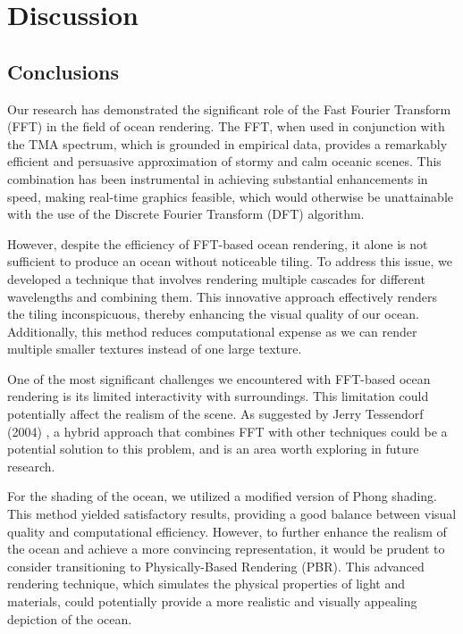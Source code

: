 \justifying
\chapter{Discussion}
\label{chapter4}

\section{Conclusions}

Our research has demonstrated the significant role of the Fast Fourier Transform (FFT) in the field of ocean rendering. The FFT, when used in conjunction with the TMA spectrum, which is grounded in empirical data, provides a remarkably efficient and persuasive approximation of stormy and calm oceanic scenes. This combination has been instrumental in achieving substantial enhancements in speed, making real-time graphics feasible, which would otherwise be unattainable with the use of the Discrete Fourier Transform (DFT) algorithm.

However, despite the efficiency of FFT-based ocean rendering, it alone is not sufficient to produce an ocean without noticeable tiling. To address this issue, we developed a technique that involves rendering multiple cascades for different wavelengths and combining them. This innovative approach effectively renders the tiling inconspicuous, thereby enhancing the visual quality of our ocean. Additionally, this method reduces computational expense as we can render multiple smaller textures instead of one large texture.

One of the most significant challenges we encountered with FFT-based ocean rendering is its limited interactivity with surroundings. This limitation could potentially affect the realism of the scene. As suggested by Jerry Tessendorf (2004) \cite{tessendorf2004}, a hybrid approach that combines FFT with other techniques could be a potential solution to this problem, and is an area worth exploring in future research.

For the shading of the ocean, we utilized a modified version of Phong shading. This method yielded satisfactory results, providing a good balance between visual quality and computational efficiency. However, to further enhance the realism of the ocean and achieve a more convincing representation, it would be prudent to consider transitioning to Physically-Based Rendering (PBR). This advanced rendering technique, which simulates the physical properties of light and materials, could potentially provide a more realistic and visually appealing depiction of the ocean.

